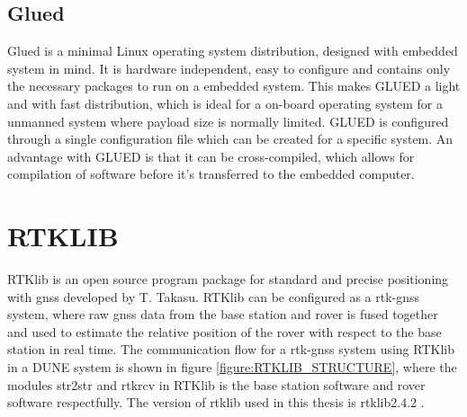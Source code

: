 \subsection{Glued}
Glued is a minimal Linux operating system distribution, designed with embedded system in mind. It is hardware independent, easy to configure and contains only the necessary packages to run on a embedded system. This makes GLUED a light and with fast distribution, which is ideal for a on-board operating system for a unmanned system where payload size is normally limited. GLUED is configured through a single configuration file which can be created for a specific system. An advantage with GLUED is that it can be cross-compiled, which allows for compilation of software before it's transferred to the embedded computer.
\section{RTKLIB}\label{ss:Rtklib}
RTKlib \citep{takasu2009development} is an open source program package for standard and precise positioning with \gls{gnss} developed by T. Takasu. RTKlib can be configured as a \gls{rtk-gnss} system, where raw \gls{gnss} data from the base station and rover is fused together and used to estimate the relative position of the rover with respect to the base station in real time. The communication flow for a \gls{rtk-gnss} system using RTKlib in a DUNE system is shown in figure \ref{figure:RTKLIB_STRUCTURE}, where the modules str2str and rtkrcv in RTKlib is the base station software and rover software respectfully. The version of \gls{rtklib} used in this thesis is \gls{rtklib}2.4.2 \citep{Rtklib242}.

